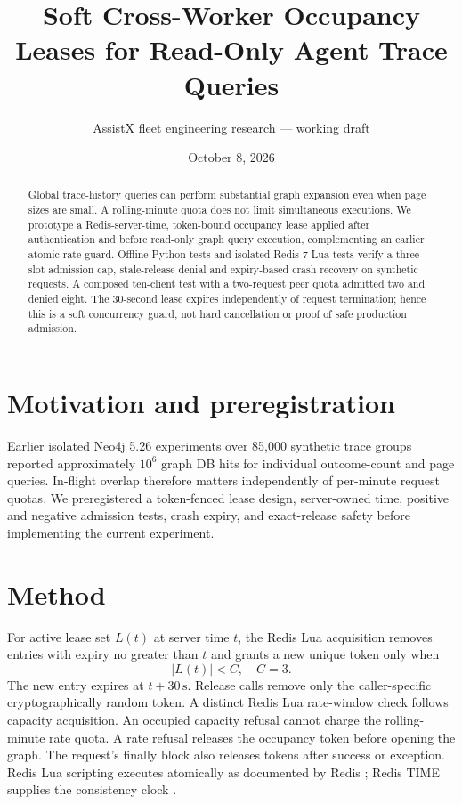 \documentclass[11pt]{article}
\title{Soft Cross-Worker Occupancy Leases for Read-Only Agent Trace Queries}
\author{AssistX fleet engineering research --- working draft}
\date{October 8, 2026}
\begin{document}
\maketitle
\begin{abstract}
Global trace-history queries can perform substantial graph expansion even when page
sizes are small. A rolling-minute quota does not limit simultaneous executions.
We prototype a Redis-server-time, token-bound occupancy lease applied after
authentication and before read-only graph query execution, complementing an
earlier atomic rate guard. Offline Python tests and isolated Redis 7 Lua tests
verify a three-slot admission cap, stale-release denial and expiry-based crash
recovery on synthetic requests. A composed ten-client test with a two-request
peer quota admitted two and denied eight. The 30-second lease expires
independently of request termination; hence this is a soft concurrency guard,
not hard cancellation or proof of safe production admission.
\end{abstract}
\section{Motivation and preregistration}
Earlier isolated Neo4j 5.26 experiments over 85,000 synthetic trace groups
reported approximately $10^6$ graph DB hits for individual outcome-count and
page queries. In-flight overlap therefore matters independently of per-minute
request quotas. We preregistered a token-fenced lease design, server-owned time,
positive and negative admission tests, crash expiry, and exact-release safety
before implementing the current experiment.
\section{Method}
For active lease set $L(t)$ at server time $t$, the Redis Lua acquisition
removes entries with expiry no greater than $t$ and grants a new unique token
only when
\[
 |L(t)| < C, \quad C=3.
\]
The new entry expires at $t+30\,\mathrm{s}$. Release calls remove only the
caller-specific cryptographically random token. A distinct Redis Lua
rate-window check follows capacity acquisition. An occupied capacity
refusal cannot charge the rolling-minute rate quota. A rate refusal releases
the occupancy token before opening the graph. The request's finally block
also releases tokens after success or exception. Redis Lua scripting executes
atomically as documented by Redis \cite{redis_eval}; Redis TIME supplies
the consistency clock \cite{redis_time}.
\end{document}
